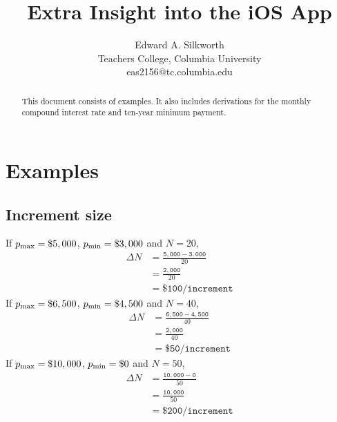 \documentclass[12pt,letterpaper,oneside]{article}
\theoremstyle{remark} %
\begin{document}
\title{Extra Insight into the iOS App}
\author{Edward A. Silkworth\\
Teachers College, Columbia University\\
eas2156@tc.columbia.edu}
\date{}

\maketitle

\begin{abstract}
This document consists of examples. It also includes derivations for the monthly compound interest rate and ten-year minimum payment.
\end{abstract}

\section{Examples}

	\subsection{Increment size}
	If $p_{\rm{max}}=\$5,000$, $p_{\rm{min}}=\$3,000$ and $N=20$,
	\begin{align*}
	\Delta N &=\frac{\mathtt{5,000}-\mathtt{3,000}}{20}\\
	&=\frac{\mathtt{2,000}}{20}\\
	&=\mathtt{\$100/increment}
	\end{align*}
	If $p_{\rm{max}}=\$6,500$, $p_{\rm{min}}=\$4,500$ and $N=40$,
	\begin{align*}
	\Delta N &=\frac{\mathtt{6,500}-\mathtt{4,500}}{40}\\
	&=\frac{\mathtt{2,000}}{40}\\
	&=\mathtt{\$50/increment}
	\end{align*}
	If $p_{\rm{max}}=\$10,000$, $p_{\rm{min}}=\$0$ and $N=50$,
	\begin{align*}
	\Delta N &=\frac{\mathtt{10,000}-\mathtt{0}}{50}\\
	&=\frac{\mathtt{10,000}}{50}\\
	&=\mathtt{\$200/increment}
	\end{align*}

	\newpage

	\rhead{\thepage} %
\end{document}
